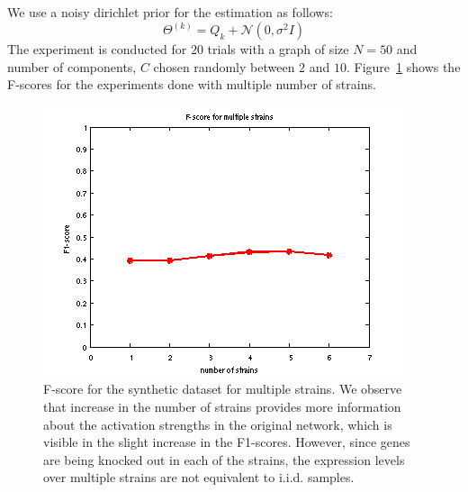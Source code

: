 \documentclass{bioinfo}
\begin{document}
We use a noisy dirichlet prior for the estimation as follows: 
\begin{equation}
  \label{eq:exp1_prior}
\Theta^{(k)}  = Q_{k} + {\mathcal N}(0, \sigma^{2} I)   
\end{equation}
The experiment is conducted for $20$ trials with a graph of size
$N=50$ and number of components, $C$ chosen randomly between $2$ and
$10$. Figure~\ref{fig:exp1_fig} shows the F-scores for the
experiments done with multiple number of strains. 
 \begin{figure}[h]
   \centering
     \includegraphics[scale=0.75]{results/Fig1_2}
   \caption{F-score for the synthetic dataset for multiple strains. We
     observe that increase in the number of strains provides more
     information about the activation strengths in the original
     network, which is visible in the slight increase in the
     F1-scores. However, since genes are being knocked out in each of
     the strains, the expression levels over multiple strains  are not equivalent to i.i.d. samples.  
   }
   \label{fig:exp1_fig}
 \end{figure}

\end{document}
